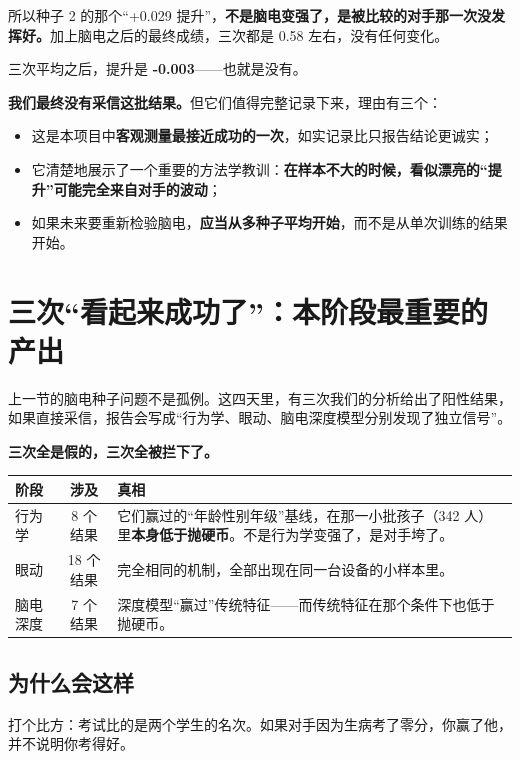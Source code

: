 \documentclass[UTF8,12pt,a4paper]{ctexart}
\newcommand{\key}[1]{\textbf{\textcolor{blue!45!black}{#1}}}
\begin{document}
所以种子 2 的那个“+0.029 提升”，\key{不是脑电变强了，是被比较的对手那一次没发挥好。}加上脑电之后的最终成绩，三次都是 0.58 左右，没有任何变化。

三次平均之后，提升是 \key{-0.003}——也就是没有。

\key{我们最终没有采信这批结果。}但它们值得完整记录下来，理由有三个：

\begin{itemize}
\item 这是本项目中\key{客观测量最接近成功的一次}，如实记录比只报告结论更诚实；
\item 它清楚地展示了一个重要的方法学教训：\key{在样本不大的时候，看似漂亮的“提升”可能完全来自对手的波动}；
\item 如果未来要重新检验脑电，\key{应当从多种子平均开始}，而不是从单次训练的结果开始。
\end{itemize}

\section{三次“看起来成功了”：本阶段最重要的产出}\label{sec:false}

上一节的脑电种子问题不是孤例。这四天里，有三次我们的分析给出了阳性结果，如果直接采信，报告会写成“行为学、眼动、脑电深度模型分别发现了独立信号”。

\key{三次全是假的，三次全被拦下了。}

\begin{center}
\begin{tabularx}{\textwidth}{@{}lcY@{}}
\toprule
\textbf{阶段} & \textbf{涉及} & \textbf{真相} \\
\midrule
行为学 & 8 个结果 & 它们赢过的“年龄性别年级”基线，在那一小批孩子（342 人）里\key{本身低于抛硬币}。不是行为学变强了，是对手垮了。 \\
眼动 & 18 个结果 & 完全相同的机制，全部出现在同一台设备的小样本里。 \\
脑电深度 & 7 个结果 & 深度模型“赢过”传统特征——而传统特征在那个条件下也低于抛硬币。 \\
\bottomrule
\end{tabularx}
\end{center}

\subsection{为什么会这样}

打个比方：考试比的是两个学生的名次。如果对手因为生病考了零分，你赢了他，并不说明你考得好。
\end{document}
